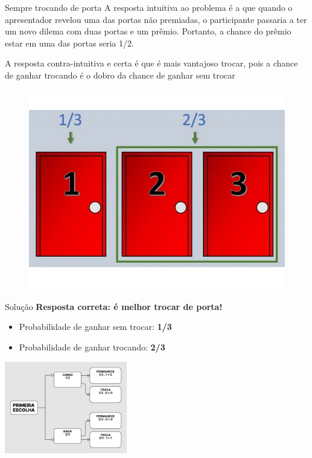 \begin{frame}[fragile]{Sempre trocando de porta}
A resposta intuitiva ao problema é a que quando o apresentador revelou uma das portas não premiadas, o participante passaria a ter um novo dilema com duas portas e um prêmio. Portanto, a chance do prêmio estar em uma das portas seria 1/2. 
 
A resposta contra-intuitiva e certa é que é mais vantajoso trocar, pois a
chance de ganhar trocando é o dobro da chance de ganhar sem trocar
\begin{figure}
    \centering
    \includegraphics[width=0.45\linewidth]{figures/porc portas.jpg}
    \label{fig:enter-label}
 \end{figure}
\end{frame}
\begin{frame}{Solução}
\textbf{Resposta correta: é melhor trocar de porta!}

\vspace{0.3cm}
\begin{itemize}
  \item Probabilidade de ganhar sem trocar: \textbf{1/3}
  \item Probabilidade de ganhar trocando: \textbf{2/3}
\end{itemize}

\vspace{0.4cm}
\centering
\includegraphics[width=0.4\textwidth]{figures/Grey and White Minimalist Simple Concept Map.png} 
\end{frame}